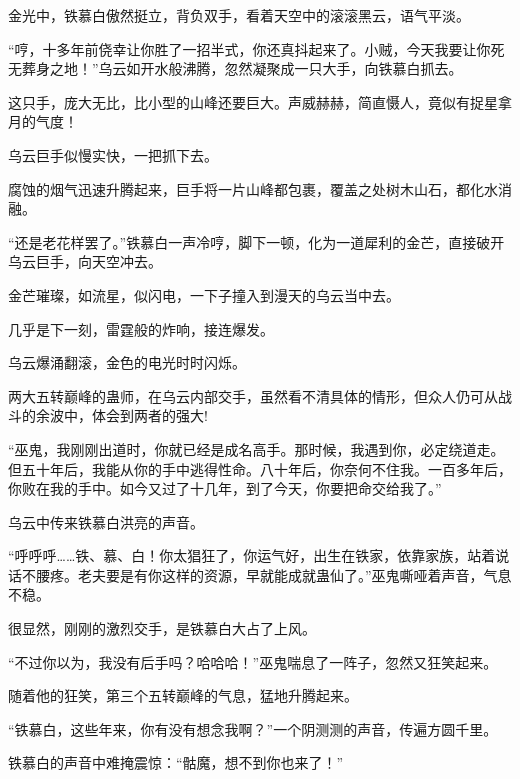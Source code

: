 \begin{this_body}
金光中，铁慕白傲然挺立，背负双手，看着天空中的滚滚黑云，语气平淡。

“哼，十多年前侥幸让你胜了一招半式，你还真抖起来了。小贼，今天我要让你死无葬身之地！”乌云如开水般沸腾，忽然凝聚成一只大手，向铁慕白抓去。

这只手，庞大无比，比小型的山峰还要巨大。声威赫赫，简直慑人，竟似有捉星拿月的气度！

乌云巨手似慢实快，一把抓下去。

腐蚀的烟气迅速升腾起来，巨手将一片山峰都包裹，覆盖之处树木山石，都化水消融。

“还是老花样罢了。”铁慕白一声冷哼，脚下一顿，化为一道犀利的金芒，直接破开乌云巨手，向天空冲去。

金芒璀璨，如流星，似闪电，一下子撞入到漫天的乌云当中去。

几乎是下一刻，雷霆般的炸响，接连爆发。

乌云爆涌翻滚，金色的电光时时闪烁。

两大五转巅峰的蛊师，在乌云内部交手，虽然看不清具体的情形，但众人仍可从战斗的余波中，体会到两者的强大!

“巫鬼，我刚刚出道时，你就已经是成名高手。那时候，我遇到你，必定绕道走。但五十年后，我能从你的手中逃得性命。八十年后，你奈何不住我。一百多年后，你败在我的手中。如今又过了十几年，到了今天，你要把命交给我了。”

乌云中传来铁慕白洪亮的声音。

“呼呼呼……铁、慕、白！你太猖狂了，你运气好，出生在铁家，依靠家族，站着说话不腰疼。老夫要是有你这样的资源，早就能成就蛊仙了。”巫鬼嘶哑着声音，气息不稳。

很显然，刚刚的激烈交手，是铁慕白大占了上风。

“不过你以为，我没有后手吗？哈哈哈！”巫鬼喘息了一阵子，忽然又狂笑起来。

随着他的狂笑，第三个五转巅峰的气息，猛地升腾起来。

“铁慕白，这些年来，你有没有想念我啊？”一个阴测测的声音，传遍方圆千里。

铁慕白的声音中难掩震惊：“骷魔，想不到你也来了！”

\end{this_body}

